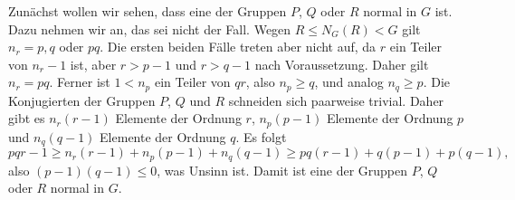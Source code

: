 \documentclass[12pt,a4paper,twoside]{article}
\begin{document}

Zun\"achst wollen wir sehen, dass eine der Gruppen $P$, $Q$ oder $R$ normal in
$G$ ist. Dazu nehmen wir an, das sei nicht der Fall. Wegen $R\le N_G(R)<G$
gilt $n_r=p,q$ oder $pq$. Die ersten beiden F\"alle treten aber nicht auf, da
$r$ ein Teiler von $n_r-1$ ist, aber $r>p-1$ und $r>q-1$ nach Voraussetzung.
Daher gilt $n_r=pq$. Ferner ist $1<n_p$ ein Teiler von $qr$, also $n_p\ge q$,
und analog $n_q\ge p$. Die Konjugierten der Gruppen $P$, $Q$ und $R$ schneiden
sich paarweise trivial. Daher gibt es $n_r(r-1)$ Elemente der Ordnung $r$,
$n_p(p-1)$ Elemente der Ordnung $p$ und $n_q(q-1)$ Elemente der Ordnung $q$.
Es folgt
\[
pqr-1\ge n_r(r-1)+n_p(p-1)+n_q(q-1)\ge pq(r-1)+q(p-1)+p(q-1),
\]
also $(p-1)(q-1)\le 0$, was Unsinn ist. Damit ist eine der Gruppen $P$, $Q$
oder $R$ normal in $G$.
\end{document}
